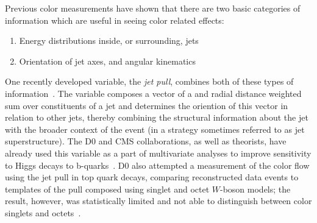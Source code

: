 Previous color measurements have shown that there are two basic categories of information which are useful in seeing color related effects:
%
\begin{enumerate}
\item Energy distributions inside, or surrounding, jets
\item Orientation of jet axes, and angular kinematics 
\end{enumerate}
%
One recently developed variable, the \textit{jet pull}, combines both of these types of information~\cite{Gallicchio:2010sw}. The variable composes a vector of a \pt and radial distance weighted sum over constituents of a jet and determines the oriention of this vector in relation to other jets, thereby combining the structural information about the jet with the broader context of the event (in a strategy sometimes referred to as jet superstructure). The D0 and CMS collaborations, as well as theorists, have already used this variable as a part of multivariate analyses to improve sensitivity to Higgs decays to b-quarks~\cite{D0higgs,CMShiggspap,CMShiggspap2}. D0 also attempted a measurement of the color flow using the jet pull in top quark decays, comparing reconstructed data events to templates of the pull composed using singlet and octet $W$-boson models; the result, however, was statistically limited and not able to distinguish between color singlets and octets~\cite{Abazov:2011vh}.

